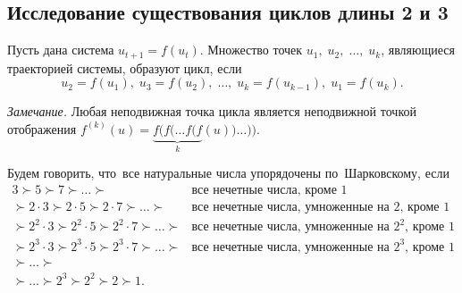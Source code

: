 \subsection{Исследование существования циклов длины 2 и 3}

\begin{definition}\label{def:cycle}
        Пусть дана система $u_{t+1} = f(u_t)$. Множество точек $u_1,\; u_2,\;\dots,\; u_k$, являющиеся траекторией системы, образуют цикл, если
        $$
                u_2 = f(u_1),\; u_3 = f(u_2),\;\dots,\;u_k = f(u_{k-1}),\; u_1 = f(u_k).
        $$
        \cite[стр.~87]{bratus10}
\end{definition}
\textit{Замечание.} Любая неподвижная точка цикла является неподвижной точкой отображения $f^{(k)}(u) = \underbrace{f(f(\dots f(f}_k (u))\dots))$.
            
\begin{definition}
        Будем говорить, что~все натуральные числа упорядочены по~Шарковскому, если
        $$
                \begin{array}{ll}
                        3 \succ 5 \succ 7 \succ \ldots \succ & \textrm{все нечетные числа, кроме $1$}\\
                        \succ 2 \cdot 3 \succ 2 \cdot 5 \succ 2 \cdot 7 \succ \ldots \succ & \textrm{все нечетные числа, умноженные на $2$, кроме $1$} \\
                        \succ 2^2 \cdot 3 \succ 2^2 \cdot 5 \succ 2^2 \cdot 7 \succ \ldots \succ & \textrm{все нечетные числа, умноженные на $2^2$, кроме $1$} \\
                        \succ 2^3 \cdot 3 \succ 2^3 \cdot 5 \succ 2^3 \cdot 7 \succ \ldots \succ & \textrm{все нечетные числа, умноженные на $2^3$, кроме $1$} \\
                        \succ \ldots \succ\\
                        \succ \ldots \succ 2^3 \succ 2^2 \succ 2 \succ 1.
                \end{array}
        $$
        \cite[стр.~88]{bratus10}
\end{definition}

